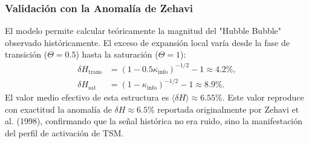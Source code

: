 \documentclass[11pt, a4paper]{article}
\theoremstyle{plain}
\theoremstyle{definition}
\begin{document}
\subsubsection{Validación con la Anomalía de Zehavi}
El modelo permite calcular teóricamente la magnitud del "Hubble Bubble" observado históricamente. El exceso de expansión local varía desde la fase de transición ($\Theta=0.5$) hasta la saturación ($\Theta=1$):
\begin{align}
\delta H_{\text{trans}} &= (1 - 0.5\kappa_{\text{info}})^{-1/2} - 1 \approx 4.2\%, \\
\delta H_{\text{sat}} &= (1 - \kappa_{\text{info}})^{-1/2} - 1 \approx 8.9\%.
\end{align}
El valor medio efectivo de esta estructura es $\langle \delta H \rangle \approx 6.55\%$. Este valor reproduce con exactitud la anomalía de $\delta H \approx 6.5\%$ reportada originalmente por Zehavi et al. (1998), confirmando que la señal histórica no era ruido, sino la manifestación del perfil de activación de TSM.

\begin{table}[h!]
\centering
\caption{Predicciones analíticas de TSM derivadas de la constante universal $\kappa_{\text{info}}$}
\label{tab:kappa_predictions}
\end{table}

\end{document}
